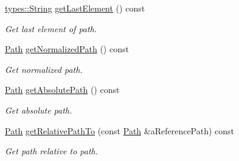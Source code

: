 \begin{DoxyCompactItemize}
\hyperlink{classlibrary_1_1core_1_1types_1_1_string}{types\+::\+String} \hyperlink{classlibrary_1_1core_1_1fs_1_1_path_a3e29def9459dd51f1c359435aae4ead1}{get\+Last\+Element} () const
\begin{DoxyCompactList}\small\item\em Get last element of path. \end{DoxyCompactList}\item 
\hyperlink{classlibrary_1_1core_1_1fs_1_1_path}{Path} \hyperlink{classlibrary_1_1core_1_1fs_1_1_path_a920b1d062cb1274da811150afafba124}{get\+Normalized\+Path} () const
\begin{DoxyCompactList}\small\item\em Get normalized path. \end{DoxyCompactList}\item 
\hyperlink{classlibrary_1_1core_1_1fs_1_1_path}{Path} \hyperlink{classlibrary_1_1core_1_1fs_1_1_path_a09dc880115d1e0a9079ac8e106e82c92}{get\+Absolute\+Path} () const
\begin{DoxyCompactList}\small\item\em Get absolute path. \end{DoxyCompactList}\item 
\hyperlink{classlibrary_1_1core_1_1fs_1_1_path}{Path} \hyperlink{classlibrary_1_1core_1_1fs_1_1_path_a8f24340e887cfbfe675e96c0ba92321f}{get\+Relative\+Path\+To} (const \hyperlink{classlibrary_1_1core_1_1fs_1_1_path}{Path} \&a\+Reference\+Path) const
\begin{DoxyCompactList}\small\item\em Get path relative to path. \end{DoxyCompactList}\end{DoxyCompactItemize}
